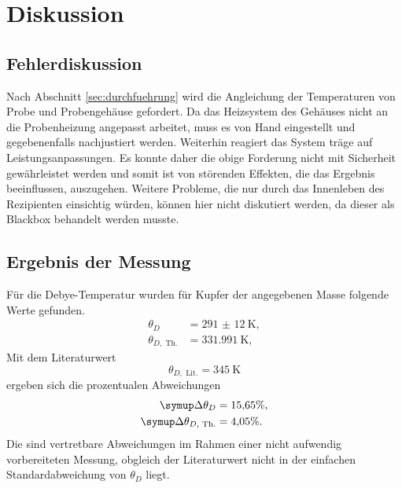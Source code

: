 \section{Diskussion}
\label{sec:Diskussion}

\subsection{Fehlerdiskussion}
Nach Abschnitt \ref{sec:durchfuehrung} wird die Angleichung der Temperaturen von Probe und Probengehäuse gefordert.
Da das Heizsystem des Gehäuses nicht an die Probenheizung angepasst arbeitet, 
muss es von Hand eingestellt und gegebenenfalls nachjustiert werden.
Weiterhin reagiert das System träge auf Leistungsanpassungen. 
Es konnte daher die obige Forderung nicht mit Sicherheit gewährleistet werden und 
somit ist von störenden Effekten, die das Ergebnis beeinflussen, auszugehen.
Weitere Probleme, 
die nur durch das Innenleben des Rezipienten einsichtig würden, können hier nicht diskutiert werden, 
da dieser als Blackbox behandelt werden musste.

\subsection{Ergebnis der Messung}
Für die Debye-Temperatur wurden für Kupfer der angegebenen Masse folgende Werte gefunden. 
\begin{align}
	\theta_D &= \SI{291(12)}{\kelvin},\\
	\theta_{D,\text{ Th.}} &= \SI{331.991}{\kelvin},
\end{align}
Mit dem Literaturwert \cite{debye-kupfer}
\begin{equation}
	\theta_{D,\text{ Lit.}} = \SI{345}{\kelvin}
\end{equation}
ergeben sich die prozentualen Abweichungen
\begin{align}
	\symup\Delta\theta_D &= 15{,}65 \%,\\
	\symup\Delta\theta_{D,\text{ Th.}} &= 4{,}05 \%.
\end{align}
Die sind vertretbare Abweichungen im Rahmen einer nicht aufwendig vorbereiteten Messung, 
obgleich der Literaturwert nicht in der einfachen Standardabweichung von $\theta_D$ liegt.

